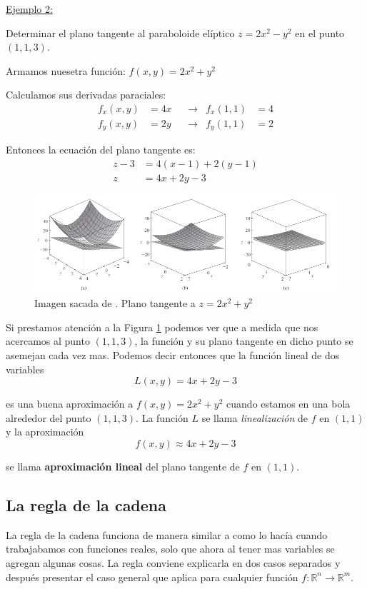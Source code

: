 \documentclass[12pt]{article}
\begin{document}
\underline{Ejemplo 2:}

Determinar el plano tangente al paraboloide elíptico $ z=2x^2 - y^2 $ en el punto $ (1,1,3) $.

Armamos nuesetra función: $ f(x,y)=2x^2+y^2 $

Calculamos sus derivadas paraciales:
\begin{align*}
	f_{x}(x,y) &= 4x && \to & f_{x}(1,1) &= 4\\
	f_{y}(x,y) &= 2y && \to & f_{y}(1,1) &= 2
\end{align*}

Entonces la ecuación del plano tangente es:
\begin{align*}
  z-3 &= 4\left(x-1\right)+2\left(y-1\right)\\
  z &= 4x+2y-3
\end{align*}

\begin{figure}[H]
  \centering
  \includegraphics[width=\linewidth]{imagenes/aprox-lineal.png}
  \caption{Imagen sacada de \parencite{stewart2}. Plano tangente a $ z=2x^2+y^2 $}
  \label{fig:aprox-lineal}
\end{figure}

Si prestamos atención a la Figura \ref{fig:aprox-lineal} podemos ver que a medida que nos acercamos al punto $ (1,1,3) $, la función y su plano tangente en dicho punto se asemejan cada vez mas. Podemos decir entonces que la función lineal de dos variables
\[
L(x,y)=4x+2y-3
\]

es una buena aproximación a $ f(x,y)=2x^2+y^2 $ cuando estamos en una bola alrededor del punto $ (1,1,3) $. La función $ L $ se llama \textit{linealización} de $ f $ en $ (1,1) $ y la aproximación 
\[
f(x,y) \approx 4x+2y-3
\]

se llama \textbf{aproximación lineal} del plano tangente de $ f $ en $ (1,1) $.

\subsection{La regla de la cadena}
La regla de la cadena funciona de manera similar a como lo hacía cuando trabajabamos con funciones reales, solo que ahora al tener mas variables se agregan algunas cosas. La regla conviene explicarla en dos casos separados y después presentar el caso general que aplica para cualquier función $ f:\mathbb{R}^{n} \to \mathbb{R}^{m} $.
\end{document}
